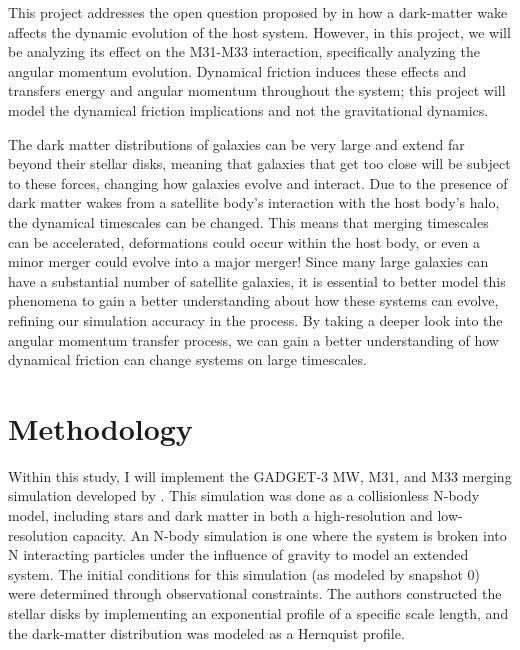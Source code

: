 \documentclass[fleqn,usenatbib]{mnras}
\begin{document}
\vspace{10pt}

This project addresses the open question proposed by \citep{Garavito-Camargo_2019} in how a dark-matter wake affects the dynamic evolution of the host system. However, in this project, we will be analyzing its effect on the M31-M33 interaction, specifically analyzing the angular momentum evolution. Dynamical friction induces these effects and transfers energy and angular momentum throughout the system; this project will model the dynamical friction implications and not the gravitational dynamics. 

\vspace{10pt}

The dark matter distributions of galaxies can be very large and extend far beyond their stellar disks, meaning that galaxies that get too close will be subject to these forces, changing how galaxies evolve and interact. Due to the presence of dark matter wakes from a satellite body's interaction with the host body's halo, the dynamical timescales can be changed. This means that merging timescales can be accelerated, deformations could occur within the host body, or even a minor merger could evolve into a major merger! Since many large galaxies can have a substantial number of satellite galaxies, it is essential to better model this phenomena to gain a better understanding about how these systems can evolve, refining our simulation accuracy in the process. By taking a deeper look into the angular momentum transfer process, we can gain a better understanding of how dynamical friction can change systems on large timescales. 


\vspace{30pt}
\section{Methodology}  %

Within this study, I will implement the GADGET-3 MW, M31, and M33 merging simulation developed by \cite{vandermarel2012}. This simulation was done as a collisionless N-body model, including stars and dark matter in both a high-resolution and low-resolution capacity. An N-body simulation is one where the system is broken into N interacting particles under the influence of gravity to model an extended system. The initial conditions for this simulation (as modeled by snapshot 0) were determined through observational constraints. The authors constructed the stellar disks by implementing an exponential profile of a specific scale length, and the dark-matter distribution was modeled as a Hernquist profile. 
\end{document}
